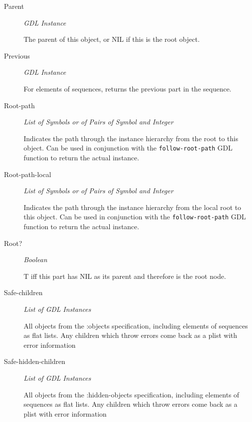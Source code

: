 \documentclass [11pt]{book}
\begin{document}
\begin{itemize}
\begin{description}
\item [Parent]
\emph{GDL Instance}

 The parent of this object, or NIL if this is the root object.




\item [Previous]
\emph{GDL Instance}

 For elements of sequences, returns the previous part in the sequence.




\item [Root-path]
\emph{List of Symbols or of Pairs of Symbol and Integer}

 Indicates the path through
the instance hierarchy from the root to this object. Can be used in conjunction with
the \texttt{follow-root-path} GDL function to return the actual instance.




\item [Root-path-local]
\emph{List of Symbols or of Pairs of Symbol and Integer}

 Indicates the path through
the instance hierarchy from the local root to this object. Can be used in conjunction with
the \texttt{follow-root-path} GDL function to return the actual instance.




\item [Root?]
\emph{Boolean}

 T iff this part has NIL as its parent and therefore is the root node.




\item [Safe-children]
\emph{List of GDL Instances}

 All objects from the :objects specification, including elements of sequences
as flat lists. Any children which throw errors come back as a plist with error information




\item [Safe-hidden-children]
\emph{List of GDL Instances}

 All objects from the :hidden-objects specification, including elements of sequences
as flat lists. Any children which throw errors come back as a plist with error information





\end{description}
\end{itemize}
\end{document}
